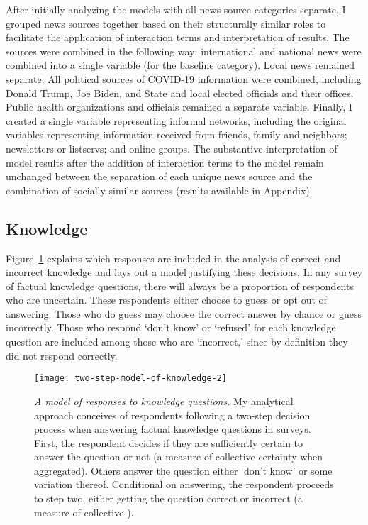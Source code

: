 \documentclass[11pt]{article}
\begin{document}
After initially analyzing the models with all news source categories separate, I grouped news sources together based on their structurally similar roles to facilitate the application of interaction terms and interpretation of results. The sources were combined in the following way: international and national news were combined into a single variable (for the baseline category). Local news remained separate. All political sources of COVID-19 information were combined, including Donald Trump, Joe Biden, and State and local elected officials and their offices. Public health organizations and officials remained a separate variable. Finally, I created a single variable representing informal networks, including the original variables representing information received from friends, family and neighbors; newsletters or listservs; and online groups. The substantive interpretation of model results after the addition of interaction terms to the model remain unchanged between the separation of each unique news source and the combination of socially similar sources (results available in Appendix).


\subsection{Knowledge}\label{sec:knowledge}

Figure~\ref{fig:TwoStepModelOfKnowledge} explains which responses are included in the analysis of correct and incorrect knowledge and lays out a model justifying these decisions. In any survey of factual knowledge questions, there will always be a proportion of respondents who are uncertain. These respondents either choose to guess or opt out of answering. Those who do guess may choose the correct answer by chance or guess incorrectly. Those who respond `don't know' or `refused' for each knowledge question are included among those who are `incorrect,' since by definition they did not respond correctly.


\begin{figure}[ht]
  \begin{center}
    \texttt{[image: two-step-model-of-knowledge-2]}
  \end{center}
  \caption[A model of responses to knowledge questions]
  {\emph{A model of responses to knowledge questions.}
   My analytical approach conceives of respondents following a two-step decision process when answering factual knowledge questions in surveys. First, the respondent decides if they are sufficiently certain to answer the question or not (a measure of collective certainty when aggregated). Others answer the question either `don't know' or some variation thereof. Conditional on answering, the respondent proceeds to step two, either getting the question correct or incorrect (a measure of collective ).}
  \label{fig:TwoStepModelOfKnowledge}
\end{figure}
\end{document}
